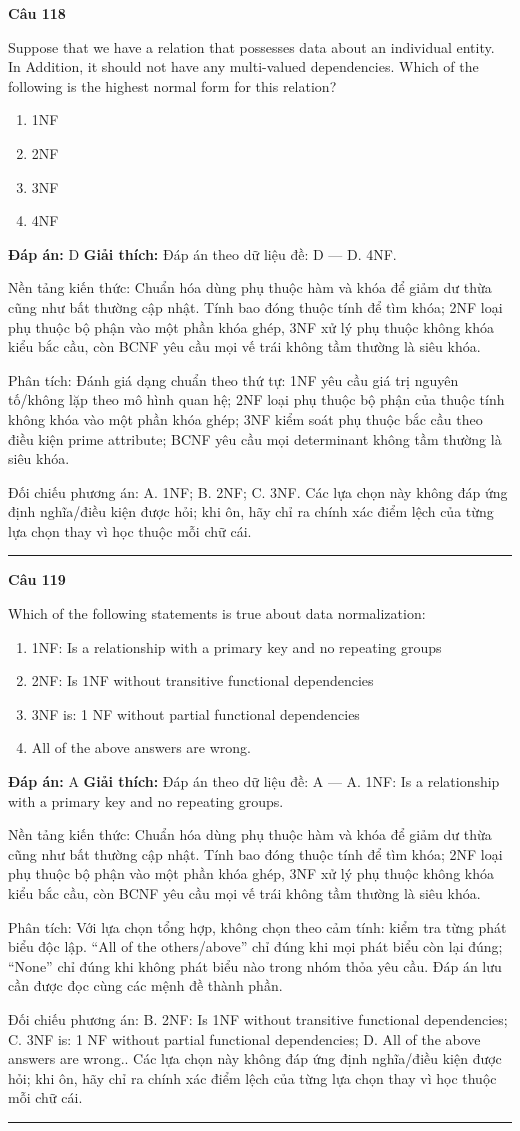 \documentclass[11pt,a4paper]{article}
\newenvironment{question}[1]{%
  \par\vspace{1em}\noindent\textbf{\large Câu #1}\par\vspace{0.4em}
}{%
  \par\vspace{1em}\hrule\vspace{0.6em}
}
\newenvironment{choices}{%
  \begin{enumerate}[label=\textbf{\Alph*.},leftmargin=2.2em,itemsep=2pt,topsep=3pt]
}{%
  \end{enumerate}
}
\newcommand{\choice}{\item}
\begin{document}
\begin{question}{118}
Suppose that we have a relation that possesses data about an individual entity. In Addition, it should not have any multi-valued dependencies.
Which of the following is the highest normal form for this relation?
\begin{choices}
\choice 1NF
\choice 2NF
\choice 3NF
\choice 4NF
\end{choices}
\textbf{Đáp án:} D
\textbf{Giải thích:} Đáp án theo dữ liệu đề: D — D. 4NF.

Nền tảng kiến thức: Chuẩn hóa dùng phụ thuộc hàm và khóa để giảm dư thừa cũng như bất thường cập nhật. Tính bao đóng thuộc tính để tìm khóa; 2NF loại phụ thuộc bộ phận vào một phần khóa ghép, 3NF xử lý phụ thuộc không khóa kiểu bắc cầu, còn BCNF yêu cầu mọi vế trái không tầm thường là siêu khóa.

Phân tích: Đánh giá dạng chuẩn theo thứ tự: 1NF yêu cầu giá trị nguyên tố/không lặp theo mô hình quan hệ; 2NF loại phụ thuộc bộ phận của thuộc tính không khóa vào một phần khóa ghép; 3NF kiểm soát phụ thuộc bắc cầu theo điều kiện prime attribute; BCNF yêu cầu mọi determinant không tầm thường là siêu khóa.

Đối chiếu phương án: A. 1NF; B. 2NF; C. 3NF. Các lựa chọn này không đáp ứng định nghĩa/điều kiện được hỏi; khi ôn, hãy chỉ ra chính xác điểm lệch của từng lựa chọn thay vì học thuộc mỗi chữ cái.
\end{question}

\begin{question}{119}
Which of the following statements is true about data normalization:
\begin{choices}
\choice 1NF: Is a relationship with a primary key and no repeating groups
\choice 2NF: Is 1NF without transitive functional dependencies
\choice 3NF is: 1 NF without partial functional dependencies
\choice All of the above answers are wrong.
\end{choices}
\textbf{Đáp án:} A
\textbf{Giải thích:} Đáp án theo dữ liệu đề: A — A. 1NF: Is a relationship with a primary key and no repeating groups.

Nền tảng kiến thức: Chuẩn hóa dùng phụ thuộc hàm và khóa để giảm dư thừa cũng như bất thường cập nhật. Tính bao đóng thuộc tính để tìm khóa; 2NF loại phụ thuộc bộ phận vào một phần khóa ghép, 3NF xử lý phụ thuộc không khóa kiểu bắc cầu, còn BCNF yêu cầu mọi vế trái không tầm thường là siêu khóa.

Phân tích: Với lựa chọn tổng hợp, không chọn theo cảm tính: kiểm tra từng phát biểu độc lập. “All of the others/above” chỉ đúng khi mọi phát biểu còn lại đúng; “None” chỉ đúng khi không phát biểu nào trong nhóm thỏa yêu cầu. Đáp án lưu cần được đọc cùng các mệnh đề thành phần.

Đối chiếu phương án: B. 2NF: Is 1NF without transitive functional dependencies; C. 3NF is: 1 NF without partial functional dependencies; D. All of the above answers are wrong.. Các lựa chọn này không đáp ứng định nghĩa/điều kiện được hỏi; khi ôn, hãy chỉ ra chính xác điểm lệch của từng lựa chọn thay vì học thuộc mỗi chữ cái.
\end{question}
\end{document}
